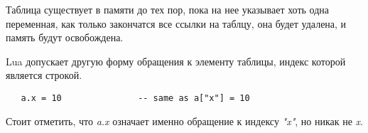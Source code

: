 Таблица существует в памяти до тех пор, пока на нее указывает хоть одна переменная, как только закончатся все ссылки на таблцу, она будет удалена, и память будут освобождена.

Lua допускает другую форму обращения к элементу таблицы, индекс которой является строкой. 

\begin{lstlisting}
   a.x = 10               -- same as a["x"] = 10
\end{lstlisting}

Стоит отметить, что \emph{a.x} означает именно обращение к индексу \emph{"x"}, но никак не \emph{x}.

